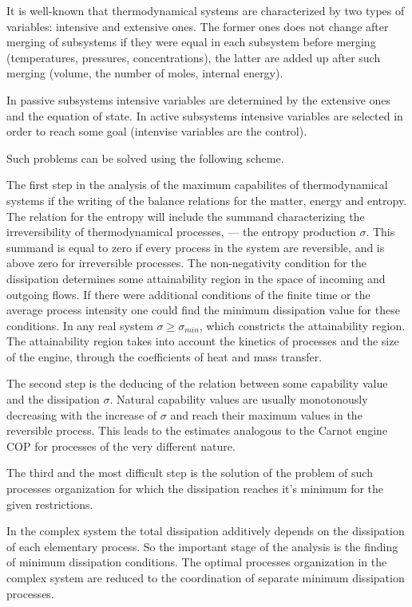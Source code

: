 \documentclass[epjST]{svjour}
\begin{document}
It is well-known that thermodynamical systems are characterized by two types of variables: intensive and extensive ones. The former ones does not change after merging of subsystems if they were equal in each subsystem before merging (temperatures, pressures, concentrations), the latter are added up after such merging (volume, the number of moles, internal energy).

In passive subsystems intensive variables are determined by the extensive ones and the equation of state. In active subsystems intensive variables are selected in order to reach some goal (intenvise variables are the control).

Such problems can be solved using the following scheme.

The first step in the analysis of the maximum capabilites of thermodynamical systems if the writing of the balance relations for the matter, energy and entropy. The relation for the entropy will include the summand characterizing the irreversibility of thermodynamical processes, --- the entropy production $\sigma$. This summand is equal to zero if every process in the system are reversible, and is above zero for irreversible processes. The non-negativity condition for the dissipation determines some attainability region in the space of incoming and outgoing flows. If there were additional conditions of the finite time or the average process intensity one could find the minimum dissipation value for these conditions. In any real system $\sigma \geq \sigma_{min}$, which constricts the attainability region. The attainability region takes into account the kinetics of processes and the size of the engine, through the coefficients of heat and mass transfer.

The second step is the deducing of the relation between some capability value and the dissipation $\sigma$. Natural capability values are usually monotonously decreasing with the increase of $\sigma$ and reach their maximum values in the reversible process. This leads to the estimates analogous to the Carnot engine COP for processes of the very different nature.

The third and the most difficult step is the solution of the problem of such processes organization for which the dissipation reaches it's minimum for the given restrictions.

In the complex system the total dissipation additively depends on the dissipation of each elementary process. So the important stage of the analysis is the finding of minimum dissipation conditions. The optimal processes organization in the complex system are reduced to the coordination of separate minimum dissipation processes.
\end{document}
